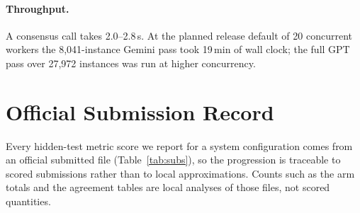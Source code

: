 \documentclass[11pt]{article}
\begin{document}
\paragraph{Throughput.} A consensus call takes 2.0--2.8\,s. At the planned release default of 20
concurrent workers the 8{,}041-instance Gemini pass took 19\,min of wall clock; the full GPT
pass over 27{,}972 instances was run at higher concurrency.

\section{Official Submission Record}
\label{app:subs}
Every hidden-test metric score we report for a system configuration comes from an official
submitted file (Table~\ref{tab:subs}), so the progression is traceable to scored submissions
rather than to local approximations. Counts such as the arm totals and the agreement tables are
local analyses of those files, not scored quantities.
\end{document}
